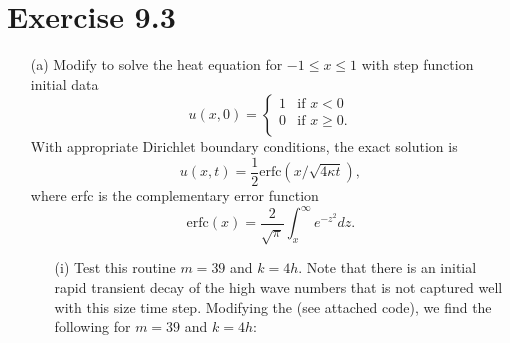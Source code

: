 \documentclass{article}
\begin{document}
\section*{Exercise 9.3}
\begin{itemize}
    \item[(a)] Modify  to solve the heat equation for $-1 \leq x \leq 1$ with step function initial data
    \[u(x,0) = \begin{cases}
        1 &\text{if } x < 0 \\
        0 &\text{if } x \geq 0.\\
    \end{cases}\]
    With appropriate Dirichlet boundary conditions, the exact solution is
    \[u(x,t) = \frac{1}{2}\text{erfc}(x/\sqrt{4\kappa t}),\]
    where erfc is the complementary error function
    \[\text{erfc}(x) = \frac{2}{\sqrt{\pi}}\int_x^{\infty}e^{-z^2}dz.\]
    \begin{itemize}
        \item[(i)] Test this routine $m = 39$ and $k = 4h$. Note that there is an initial rapid transient decay of the high wave numbers that is not captured well with this size time step.
        \newline\newline
        Modifying the  (see attached code), we find the following for $m = 39$ and $k = 4h$:
        

\end{itemize}
\end{itemize}
\end{document}
